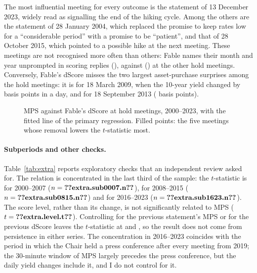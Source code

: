 The most influential meeting for every outcome is the statement of 13 December 2023, widely read as
signalling the end of the hiking cycle. Among the others are the statement of 28 January 2004, which
replaced the promise to keep rates low for a ``considerable period'' with a promise to be ``patient'', and
that of 28 October 2015, which pointed to a possible hike at the next meeting. These meetings are not
recognised more often than others: Fable names their month and year unprompted in  scoring
replies (), against  () at the other hold meetings.
Conversely, Fable's dScore misses the two largest asset-purchase surprises among the hold meetings: it is
 for 18 March 2009, when the 10-year yield changed by  basis
points in a day, and  for 18 September 2013 ( basis points).

\begin{table}[t]
\centering
\caption{Influence of individual meetings}\label{tab:influence}
\footnotesize

\end{table}

\begin{figure}[t]
\centering

\caption{MPS against Fable's dScore at  hold meetings, 2000--2023, with the fitted line of the
primary regression. Filled points: the five meetings whose removal lowers the $t$-statistic most.}\label{fig:scatter}
\end{figure}

\paragraph{Subperiods and other checks.} Table~\ref{tab:extra} reports exploratory checks that an
independent review asked for. The relation is concentrated in the last third of the sample: the
$t$-statistic is  for 2000--2007 ($n=\R{extra.sub0007.n}$),  for
2008--2015 ($n=\R{extra.sub0815.n}$) and  for 2016--2023 ($n=\R{extra.sub1623.n}$). The
score level, rather than its change, is not significantly related to MPS ($t=\R{extra.level.t}$).
Controlling for the previous statement's MPS or for the previous dScore leaves the $t$-statistic at
 and , so the result does not come from persistence in either series.
The concentration in 2016--2023 coincides with the period in which the Chair held a press conference
after every meeting from 2019; the 30-minute window of MPS largely precedes the press conference, but the
daily yield changes include it, and I do not control for it.

